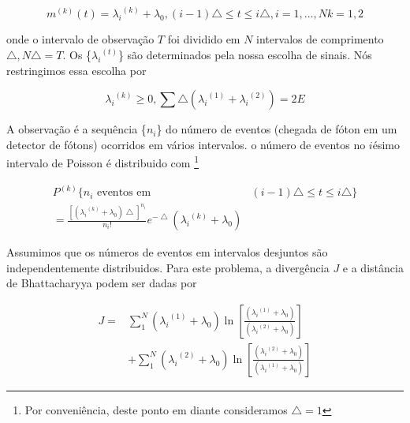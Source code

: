 \documentclass{sbrt2017port}
\begin{document}
\begin{equation}
 m^{(k)}(t) = {\lambda_i}^{(k)} + \lambda_0, (i-1)\bigtriangleup \leq t \leq i\bigtriangleup, i = 1,...,N k = 1,2
 \label{eq24}
\end{equation}

onde o intervalo de observação $T$ foi dividido em $N$ intervalos de comprimento $\bigtriangleup, N\bigtriangleup = T$. Os \{${\lambda_i}^{(t)}$\} são determinados pela nossa escolha de sinais. Nós restringimos essa escolha por

\begin{equation}
 {\lambda_i}^{(k)} \geq 0, \sum \bigtriangleup({\lambda_i}^{(1)} + {\lambda_i}^{(2)}) = 2E
 \label{eq25}
\end{equation}

A observação é a sequência \{$n_i$\} do número de eventos (chegada de fóton em um detector de fótons) ocorridos em vários intervalos. o número de eventos no $i$ésimo intervalo de Poisson é distribuido com \footnote[9]{Por conveniência, deste ponto em diante consideramos $\bigtriangleup = 1$}

\begin{equation}\label{eq26}
	\begin{split}
 	P^{(k)}  \{ n_i \text{ eventos em } & (i-1)\bigtriangleup \leq t \leq i\bigtriangleup  \} \\
 	 = \frac{{[({\lambda_i}^{(k)} + \lambda_0)\bigtriangleup]}^{n_i}}{n_i!} e^{-\bigtriangleup}({\lambda_i}^{(k)} + \lambda_0)
 	\end{split}
\end{equation}

Assumimos que os números de eventos em intervalos desjuntos são independentemente distribuidos. Para este problema, a divergência $J$ e a distância de Bhattacharyya podem ser dadas por

\begin{equation}\label{eq27}
	\begin{split}
 	J = & \sum_{1}^{N} ({\lambda_i}^{(1)} + \lambda_0) \ln \left[ \frac{({\lambda_i}^{(1)} + \lambda_0)}{({\lambda_i}^{(2)} + \lambda_0)} \right] \\
 	 & + \sum_{1}^{N} ({\lambda_i}^{(2)} + \lambda_0) \ln \left[ \frac{({\lambda_i}^{(2)} + \lambda_0)}{({\lambda_i}^{(1)} + \lambda_0)} \right]
 	\end{split}
\end{equation}
\end{document}
